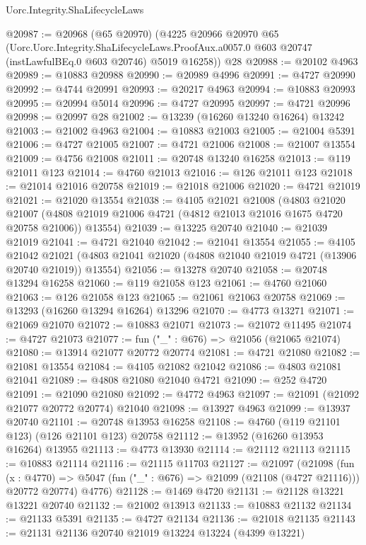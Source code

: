 \begin{lexlean}{Uorc.Integrity.ShaLifecycleLaws}
\begin{coremodule}
@20987 := @20968
    (@65 @20970)
    (@4225
      @20966
      @20970
      @65
      (Uorc.Uorc.Integrity.ShaLifecycleLaws.ProofAux.a0057.{0}
        @603
        @20747
        (instLawfulBEq.{0} @603 @20746)
        @5019
        @16258))
    @28
@20988 := @20102 @4963
@20989 := @10883 @20988
@20990 := @20989 @4996
@20991 := @4727 @20990
@20992 := @4744 @20991
@20993 := @20217 @4963
@20994 := @10883 @20993
@20995 := @20994 @5014
@20996 := @4727 @20995
@20997 := @4721 @20996
@20998 := @20997 @28
@21002 := @13239 (@16260 @13240 @16264) @13242
@21003 := @21002 @4963
@21004 := @10883 @21003
@21005 := @21004 @5391
@21006 := @4727 @21005
@21007 := @4721 @21006
@21008 := @21007 @13554
@21009 := @4756 @21008
@21011 := @20748 @13240 @16258
@21013 := @119 @21011 @123
@21014 := @4760 @21013
@21016 := @126 @21011 @123
@21018 := @21014 @21016 @20758
@21019 := @21018 @21006
@21020 := @4721 @21019
@21021 := @21020 @13554
@21038 := @4105
    @21021
    @21008
    (@4803
      @21020
      @21007
      (@4808 @21019 @21006 @4721 (@4812 @21013 @21016 @1675 @4720 @20758 @21006))
      @13554)
@21039 := @13225 @20740
@21040 := @21039 @21019
@21041 := @4721 @21040
@21042 := @21041 @13554
@21055 := @4105
    @21042
    @21021
    (@4803 @21041 @21020 (@4808 @21040 @21019 @4721 (@13906 @20740 @21019)) @13554)
@21056 := @13278 @20740
@21058 := @20748 @13294 @16258
@21060 := @119 @21058 @123
@21061 := @4760 @21060
@21063 := @126 @21058 @123
@21065 := @21061 @21063 @20758
@21069 := @13293 (@16260 @13294 @16264) @13296
@21070 := @4773 @13271
@21071 := @21069 @21070
@21072 := @10883 @21071
@21073 := @21072 @11495
@21074 := @4727 @21073
@21077 := fun ("_" : @676) => @21056 (@21065 @21074)
@21080 := @13914 @21077 @20772 @20774
@21081 := @4721 @21080
@21082 := @21081 @13554
@21084 := @4105 @21082 @21042
@21086 := @4803 @21081 @21041
@21089 := @4808 @21080 @21040 @4721
@21090 := @252 @4720
@21091 := @21090 @21080
@21092 := @4772 @4963
@21097 := @21091 (@21092 @21077 @20772 @20774) @21040
@21098 := @13927 @4963
@21099 := @13937 @20740
@21101 := @20748 @13953 @16258
@21108 := @4760 (@119 @21101 @123) (@126 @21101 @123) @20758
@21112 := @13952 (@16260 @13953 @16264) @13955
@21113 := @4773 @13930
@21114 := @21112 @21113
@21115 := @10883 @21114
@21116 := @21115 @11703
@21127 := @21097
    (@21098
      (fun (x : @4770) => @5047 (fun ("_" : @676) => @21099 (@21108 (@4727 @21116))) @20772 @20774)
      @4776)
@21128 := @1469 @4720
@21131 := @21128 @13221 @13221 @20740
@21132 := @21002 @13913
@21133 := @10883 @21132
@21134 := @21133 @5391
@21135 := @4727 @21134
@21136 := @21018 @21135
@21143 := @21131 @21136 @20740 @21019 @13224 @13224 (@4399 @13221)

\end{coremodule}
\end{lexlean}
